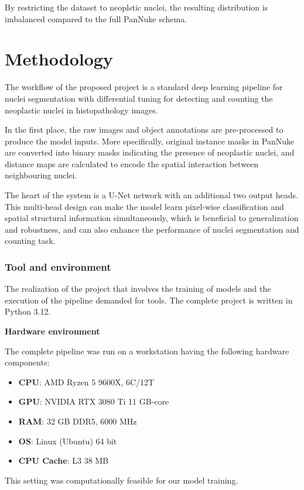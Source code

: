 \documentclass[target=bach,aauheader=,style=]{thud}
\begin{document}
By restricting the dataset to neoplstic nuclei, the resulting distribution is imbalanced compared to the full PanNuke schema.
\chapter{Methodology}
\label{sec:methodology}
The workflow of the proposed project is a standard deep learning pipeline for nuclei segmentation with differential tuning for detecting and counting the neoplastic nuclei in histopathology images.

In the first place, the raw images and object annotations are pre-processed to produce the model inputs. More specifically, original instance masks in PanNuke are converted into binary masks indicating the presence of neoplastic nuclei, and distance maps are calculated to encode the spatial interaction between neighbouring nuclei.

The heart of the system is a U-Net \cite{DBLP:journals/corr/RonnebergerFB15} network with an additional two output heads. This multi-head design can make the model learn pixel-wise classification and spatial structural information simultaneously, which is beneficial to generalization and robustness, and can also enhance the performance of nuclei segmentation and counting task.

\subsection{Tool and environment} The realization of the project that involves the training of models and the execution of the pipeline demanded for tools. The complete project is written in Python 3.12. \

\noindent\textbf{Hardware environment}\

\noindent The complete pipeline was run on a workstation having the following hardware components: \begin{itemize} 
    \item \textbf{CPU}: AMD Ryzen 5 9600X, 6C/12T 
    \item \textbf{GPU}: NVIDIA RTX 3080 Ti 11 GB-core
    \item \textbf{RAM}: 32 GB DDR5, 6000 MHz 
    \item \textbf{OS}: Linux (Ubuntu) 64 bit 
    \item \textbf{CPU Cache}: L3 38 MB 
\end{itemize} 
This setting was computationally feasible for our model training.
\end{document}
